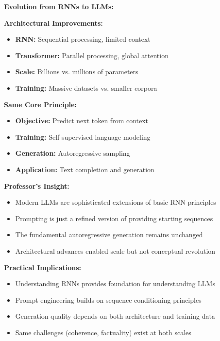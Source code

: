 \documentclass[12pt]{article}
\begin{document}
\begin{enumerate}[(a)]
{    \textbf{Evolution from RNNs to LLMs:}
    
    \textbf{Architectural Improvements:}
    \begin{itemize}
        \item \textbf{RNN:} Sequential processing, limited context
        \item \textbf{Transformer:} Parallel processing, global attention
        \item \textbf{Scale:} Billions vs. millions of parameters
        \item \textbf{Training:} Massive datasets vs. smaller corpora
    \end{itemize}
    
    \textbf{Same Core Principle:}
    \begin{itemize}
        \item \textbf{Objective:} Predict next token from context
        \item \textbf{Training:} Self-supervised language modeling
        \item \textbf{Generation:} Autoregressive sampling
        \item \textbf{Application:} Text completion and generation
    \end{itemize}
    
    \textbf{Professor's Insight:}
    \begin{itemize}
        \item Modern LLMs are sophisticated extensions of basic RNN principles
        \item Prompting is just a refined version of providing starting sequences
        \item The fundamental autoregressive generation remains unchanged
        \item Architectural advances enabled scale but not conceptual revolution
    \end{itemize}
    
    \textbf{Practical Implications:}
    \begin{itemize}
        \item Understanding RNNs provides foundation for understanding LLMs
        \item Prompt engineering builds on sequence conditioning principles
        \item Generation quality depends on both architecture and training data
        \item Same challenges (coherence, factuality) exist at both scales
    \end{itemize}
    }
    

\end{enumerate}
\end{document}
